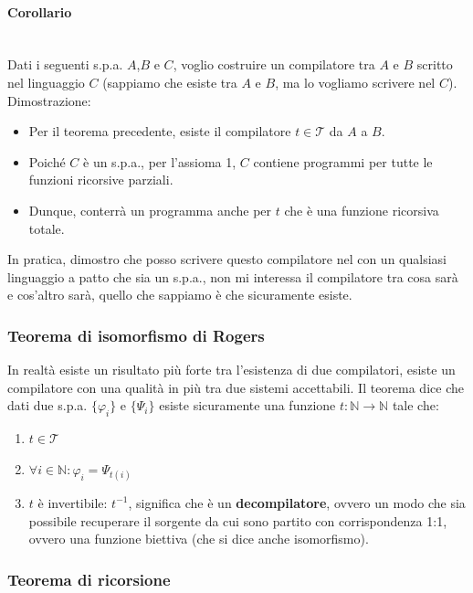 \documentclass{article}
\begin{document}
\paragraph{Corollario}\mbox{}\\
Dati i seguenti s.p.a. $A$,$B$ e $C$, voglio costruire un compilatore tra $A$ e $B$ scritto
nel linguaggio $C$ (sappiamo che esiste tra $A$ e $B$, ma lo vogliamo scrivere nel $C$).\\Dimostrazione:

\begin{itemize}
    \item Per il teorema precedente, esiste il compilatore $t\in\mathcal{T}$ da $A$ a $B$.
    \item Poiché $C$ è un s.p.a., per l'assioma 1, $C$ contiene programmi per tutte le funzioni
          ricorsive parziali.
    \item Dunque, conterrà un programma anche per $t$ che è una funzione ricorsiva totale.
\end{itemize}
In pratica, dimostro che posso scrivere questo compilatore nel con un qualsiasi linguaggio
a patto che sia un s.p.a., non mi interessa il compilatore tra cosa sarà e cos'altro sarà,
quello che sappiamo è che sicuramente esiste.

\subsubsection{Teorema di isomorfismo di Rogers}
In realtà esiste un risultato più forte tra l'esistenza di due compilatori,
esiste un compilatore con una qualità in più tra due sistemi accettabili. Il teorema dice che
dati due s.p.a. $\{\varphi_i\}$ e $\{\Psi_i\}$ esiste sicuramente una funzione $t:\mathbb{N}\rightarrow\mathbb{N}$ tale che:
\begin{enumerate}
    \item $t\in\mathcal{T}$
    \item $\forall i\in\mathbb{N}:\varphi_i=\Psi_{t(i)}$
    \item $t$ è invertibile: $t^{-1}$, significa che è un \textbf{decompilatore}, ovvero un modo
          che sia possibile recuperare il sorgente da cui sono partito con corrispondenza 1:1, ovvero
          una funzione biettiva (che si dice anche isomorfismo).
\end{enumerate}

\subsubsection{Teorema di ricorsione}
\end{document}
